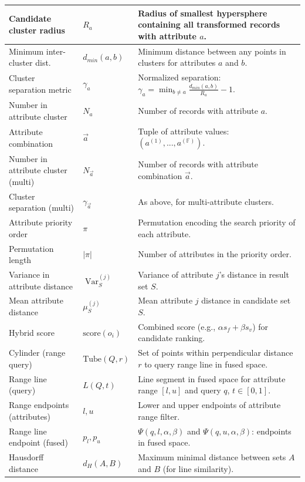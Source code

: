 \documentclass[numbers,sort]{article}
\begin{document}
\begin{longtable}{p{3.5cm} p{1.5cm} p{7.8cm}}
\midrule
Candidate cluster radius & $R_a$ & Radius of smallest hypersphere containing all transformed records with attribute $a$. \\
\midrule
Minimum inter-cluster dist. & $d_{min}(a, b)$ & Minimum distance between any points in clusters for attributes $a$ and $b$. \\
\midrule
Cluster separation metric & $\gamma_a$ & Normalized separation: $\gamma_a = \min_{b \neq a} \frac{d_{min}(a,b)}{R_a} - 1$. \\
\midrule
Number in attribute cluster & $N_a$ & Number of records with attribute $a$. \\
\midrule
Attribute combination & $\vec{a}$ & Tuple of attribute values: $(a^{(1)}, ..., a^{(\mathbb{F})})$. \\
\midrule
Number in attribute cluster (multi) & $N_{\vec{a}}$ & Number of records with attribute combination $\vec{a}$. \\
\midrule
Cluster separation (multi) & $\gamma_{\vec{a}}$ & As above, for multi-attribute clusters. \\
\midrule
Attribute priority order & $\pi$ & Permutation encoding the search priority of each attribute. \\
\midrule
Permutation length & $|\pi|$ & Number of attributes in the priority order. \\
\midrule
Variance in attribute distance & $\operatorname{Var}_S^{(j)}$ & Variance of attribute $j$'s distance in result set $S$. \\
\midrule
Mean attribute distance & $\mu_S^{(j)}$ & Mean attribute $j$ distance in candidate set $S$. \\
\midrule
Hybrid score & $\text{score}(o_i)$ & Combined score (e.g., $\alpha s_f + \beta s_v$) for candidate ranking. \\
\midrule
Cylinder (range query) & $\text{Tube}(Q, r)$ & Set of points within perpendicular distance $r$ to query range line in fused space. \\
\midrule
Range line (query) & $L(Q, t)$ & Line segment in fused space for attribute range $[l, u]$ and query $q$, $t\in[0,1]$. \\
\midrule
Range endpoints (attributes) & $l, u$ & Lower and upper endpoints of attribute range filter. \\
\midrule
Range line endpoint (fused) & $p_l, p_u$ & $\Psi(q, l, \alpha, \beta)$ and $\Psi(q, u, \alpha, \beta)$: endpoints in fused space. \\
\midrule
Hausdorff distance & $d_H(A, B)$ & Maximum minimal distance between sets $A$ and $B$ (for line similarity). \\

\end{longtable}
\end{document}

